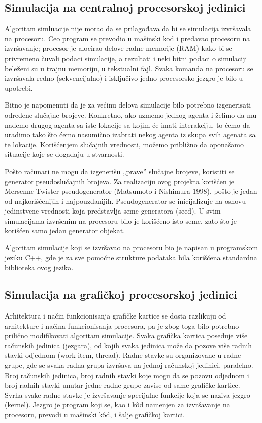 \subsection{Simulacija na centralnoj procesorskoj jedinici}

Algoritam simluacije nije morao da se prilagođava da bi se simulacija izvršavala na procesoru. Ceo program se prevodio u mašinski kod i predavao procesoru na izvršavanje; procesor je alocirao delove radne memorije (RAM) kako bi se privremeno čuvali podaci simulacije, a rezultati i neki bitni podaci o simulaciji beleženi su u trajnu memoriju, u tekstualni fajl. Svaka komanda na procesoru se izvršavala redno (sekvencijalno) i isključivo jedno procesorsko jezgro je bilo u upotrebi.

Bitno je napomenuti da je za većinu delova simulacije bilo potrebno izgenerisati određene slučajne brojeve. Konkretno, ako uzmemo jednog agenta i želimo da mu nađemo drugog agenta sa iste lokacije sa kojim će imati interakciju, to ćemo da uradimo tako što ćemo nasumično izabrati nekog agenta iz skupa svih agenata sa te lokacije. Korišćenjem slučajnih vrednosti, možemo približno da oponašamo situacije koje se događaju u stvarnosti.

Pošto računari ne mogu da izgenerišu „prave” slučajne brojeve, koristiti se generator pseudoslučajnih brojeva. Za realizaciju ovog projekta korišćen je Mersenne Twister pseudogenerator (Matsumoto i Nishimura 1998), pošto je jedan od najkorišćenijih i najpouzdanijih. Pseudogenerator se inicijalizuje na osnovu jedinstvene vrednosti koja predstavlja seme generatora (seed). U svim simulacijama izvršenim na procesoru bilo je korišćeno isto seme, zato što je korišćen samo jedan generator objekat.

Algoritam simulacije koji se izvršavao na procesoru bio je napisan u programskom jeziku C++, gde je za sve pomoćne strukture podataka bila korišćena standardna biblioteka ovog jezika.

\subsection{Simulacija na grafičkoj procesorskoj jedinici}

Arhitektura i način funkcionisanja grafičke kartice se dosta razlikuju od arhitekture i načina funkcionisanja procesora, pa je zbog toga bilo potrebno prilično modifikovati algoritam simulacije. Svaka grafička kartica poseduje više računskih jedinica (jezgara), od kojih svaka jedinica može da pozove više radnih stavki odjednom (work-item, thread). Radne stavke su organizovane u radne grupe, gde se svaka radna grupa izvršava na jednoj računskoj jedinici, paralelno. Broj računskih jedinica, broj radnih stavki koje mogu da se pozovu odjednom i broj radnih stavki unutar jedne radne grupe zavise od same grafičke kartice. Svrha svake radne stavke je izvršavanje specijalne funkcije koja se naziva jezgro (kernel). Jezgro je program koji se, kao i kôd namenjen za izvršavanje na procesoru, prevodi u mašinski kôd, i šalje grafičkoj kartici.

